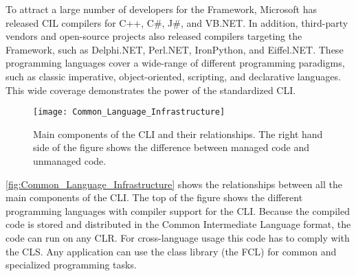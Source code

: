 To attract a large number of developers for the \dotNET Framework, Microsoft has released CIL compilers for C++, C\#, J\#, and VB.NET.
In addition, third-party vendors and open-source projects also released compilers targeting the \dotNET Framework, such as Delphi.NET, Perl.NET, IronPython, and Eiffel.NET.
These programming languages cover a wide-range of different programming paradigms, such as classic imperative, object-oriented, scripting, and declarative languages. This wide coverage demonstrates the power of the standardized CLI.

\begin{figure}[htbp]
 \centering
 \texttt{[image: Common\_Language\_Infrastructure]}
 \caption[Main components of the CLI and their relationships]{%
    Main components of the CLI and their relationships.
    The right hand side of the figure shows the difference between managed code and unmanaged code.}
 \label{fig:Common_Language_Infrastructure}
\end{figure}

\autoref{fig:Common_Language_Infrastructure} shows the relationships between all the main components of the CLI.
The top of the figure shows the different programming languages with compiler support for the CLI. Because the compiled code is stored and distributed in the Common Intermediate Language format, the code can run on any CLR. For cross-language usage this code has to comply with the CLS.
Any application can use the class library (the FCL) for common and specialized programming tasks. 